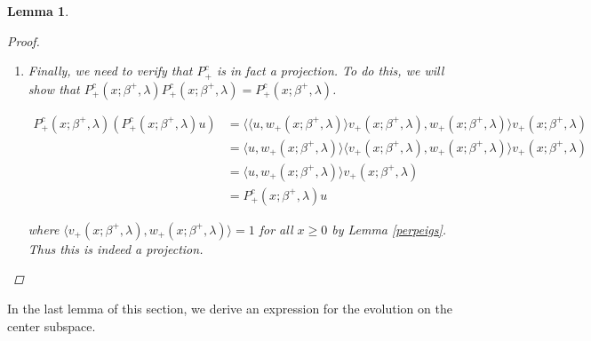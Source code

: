\documentclass[12pt]{article}
\DeclareMathOperator{\spn}{span}
\newtheorem{lemma}{Lemma}
\begin{document}
\begin{lemma}
\begin{proof}
\begin{enumerate}
$P^c_+$ is clearly linear, and its range is $\spn\{ v_+(x; \beta^+, \lambda) \}$, which is exactly what we want. Using Lemmas \ref{perpouter} and \ref{perpinner}, 

\[
\ker P^c_+(x; \beta^+, \lambda) = R^s_+(x; \beta^+, \lambda) \oplus R^u_+(x; \beta^+, \lambda)
\]

which is also exactly what we want.

\item Finally, we need to verify that $P^c_+$ is in fact a projection. To do this, we will show that $P^c_+(x; \beta^+, \lambda)P^c_+(x; \beta^+, \lambda) = P^c_+(x; \beta^+, \lambda)$.

\begin{align*}
P^c_+(x; \beta^+, \lambda)( P^c_+(x; \beta^+, \lambda) u ) &= \langle \langle u, w_+(x; \beta^+, \lambda) \rangle v_+(x; \beta^+, \lambda), w_+(x; \beta^+, \lambda) \rangle v_+(x; \beta^+, \lambda) \\
&= \langle u, w_+(x; \beta^+, \lambda) \rangle \langle v_+(x; \beta^+, \lambda), w_+(x; \beta^+, \lambda) \rangle v_+(x; \beta^+, \lambda) \\
&= \langle u, w_+(x; \beta^+, \lambda) \rangle v_+(x; \beta^+, \lambda) \\
&= P^c_+(x; \beta^+, \lambda) u 
\end{align*}

where $\langle v_+(x; \beta^+, \lambda), w_+(x; \beta^+, \lambda) \rangle = 1$ for all $x \geq 0$ by Lemma \ref{perpeigs}. Thus this is indeed a projection.
\end{enumerate}
\end{proof}
\end{lemma}

In the last lemma of this section, we derive an expression for the evolution on the center subspace.

\end{document}
